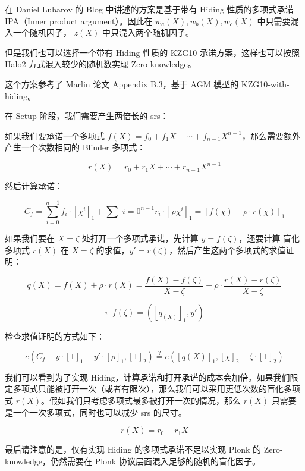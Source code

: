 在 Daniel Lubarov 的 Blog 中讲述的方案是基于带有 Hiding 性质的多项式承诺
IPA（Inner product argument）。因此在 \(w_a(X),w_b(X),w_c(X)\)
中只需要混入一个随机因子， \(z(X)\) 中只混入两个随机因子。

但是我们也可以选择一个带有 Hiding 性质的 KZG10 承诺方案，这样也可以按照
Halo2 方式混入较少的随机数实现 Zero-knowledge。

这个方案参考了 Marlin 论文\cite{Marlin} Appendix B.3，基于 AGM 模型的
KZG10-with-hiding。

在 Setup 阶段，我们需要产生两倍长的 srs：


如果我们要承诺一个多项式
\(f(X)=f_0+f_1X+\cdots+f_{n-1}X^{n-1}\)，那么需要额外产生一个次数相同的
Blinder 多项式：

\[
r(X) = r_0 + r_1X+\cdots + r_{n-1}X^{n-1}
\]

然后计算承诺：

\[
C_f = \sum_{i=0}^{n-1}f_i\cdot [\chi^i]_1 + \sum\_{i=0}^{n-1}r_i\cdot[\rho\chi^i]_1 = [f(\chi)+\rho\cdot r(\chi)]_1
\]

如果我们要在 \(X=\zeta\) 处打开一个多项式承诺，先计算
\(y=f(\zeta)\)，还要计算 盲化多项式 \(r(X)\) 在 \(X=\zeta\)
的求值，\(y'=r(\zeta)\)，然后产生这两个多项式的求值证明：

\[
q(X) = f(X) + \rho\cdot r(X) = \frac{f(X)-f(\zeta)}{X-\zeta} + \rho\cdot \frac{r(X)-r(\zeta)}{X-\zeta}
\]

\[
\pi\_{f(\zeta)} = ([q_(X)]_1, y')
\]

检查求值证明的方式如下：

\[
e(C_f - y\cdot[1]_1-y'\cdot[\rho]_1, [1]_2) \overset{?}{=} e([q(X)]_1, [\chi]_2-\zeta\cdot[1]_2)
\]

我们可以看到为了实现
Hiding，计算承诺和打开承诺的成本会加倍。如果我们限定多项式只能被打开一次（或者有限次），那么我们可以采用更低次数的盲化多项式
\(r(X)\)。假如我们只考虑多项式最多被打开一次的情况，那么 \(r(X)\)
只需要是一个一次多项式，同时也可以减少 srs 的尺寸。

\[
r(X) = r_0 + r_1 X
\]

最后请注意的是，仅有实现 Hiding 的多项式承诺不足以实现 Plonk 的
Zero-knowledge，仍然需要在 Plonk 协议层面混入足够的随机的盲化因子。

